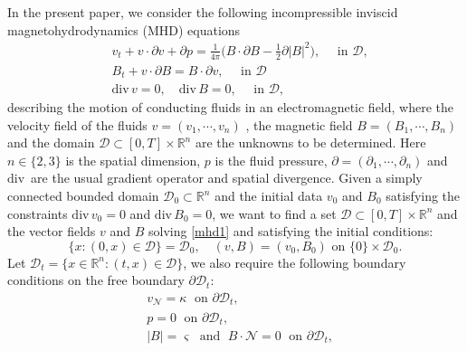 \documentclass[12pt,reqno]{amsart}
\numberwithin{equation}{section}
\theoremstyle{definition}
\theoremstyle{remark}
\begin{document}
In the present paper, we consider the following incompressible inviscid magnetohydrodynamics (MHD) equations
\begin{subequations}\label{mhd1}
  \begin{align}
    &{v}_t+{v}\cdot{\partial} {v}+{\partial} p=\frac{1}{4\pi}\big({B}\cdot{\partial} {B}-\frac{1}{2}{\partial} |{B}|^2\big),  \quad \text{ in } {{\mathscr{D}}}, \label{mhd1.1}\\
    &{B}_t+{v}\cdot {\partial} {B}={B}\cdot {\partial}{v}, \quad \text{ in } {{\mathscr{D}}} \label{mhd1.2}\\
    &{\mathrm{div}\,} {v}=0,  \quad {\mathrm{div}\,} {B}=0 , \quad \text{ in } {{\mathscr{D}}} ,\label{mhd1.3}\end{align}
\end{subequations}
describing the motion  of conducting fluids in an electromagnetic field, where the velocity field of the fluids ${v}=(v_1,\cdots,v_n)$ ,  the magnetic field ${B}=(B_1,\cdots,B_n)$  and the domain
${{\mathscr{D}}}\subset [0,  T]\times {\mathbb R}^n$ are the unknowns to be determined. Here $n\in\{2,3\}$ is the spatial dimension, $p$ is the fluid pressure, ${\partial}=({\partial}_1,\cdots,{\partial}_n)$ and ${\mathrm{div}\,}$ are the usual gradient operator and spatial divergence. Given a simply connected bounded domain ${{\mathscr{D}}}_0\subset {\mathbb R}^n$ and the initial data ${v}_0$ and ${B}_0$ satisfying the constraints $ {\mathrm{div}\,} {v}_0=0$ and ${\mathrm{div}\,} {B}_0=0$, we want to find a set ${{\mathscr{D}}}\subset [0, T]\times {\mathbb R}^n$ and the vector fields ${v}$ and ${B}$ solving \eqref{mhd1} and satisfying the initial conditions:
\begin{equation}\label{initialcondition}
\{x: (0, x)\in {{\mathscr{D}}}\}={{\mathscr{D}}}_0, \quad  ({v}, {B})=({v}_0, {B}_0)  \text{ on } \{0\}\times {{\mathscr{D}}}_0.
\end{equation}
Let ${{\mathscr{D}}}_t=\{x\in{\mathbb R}^n: (t, x)\in {{\mathscr{D}}}\}$, we also require the following boundary conditions on the free boundary $ {\partial}{{\mathscr{D}_t}}$:
\begin{subequations}\label{mhd1'}
  \begin{align}
  &{v}_{\mathcal{N}}=\kappa \;\text{ on }   {\partial}{{\mathscr{D}}}_t, \label{mhd1.5'}\\
   &p=0 \;\text{ on }  {\partial}{{\mathscr{D}}}_t, \label{mhd1.5}\\
 &|{B}|={\varsigma} \;\text{ and }\;   {B}\cdot {\mathcal{N}}=0 \;\text{ on } {\partial}{{\mathscr{D}}}_t,\label{mhd1.4}
   \end{align}\end{subequations}
\end{document}
